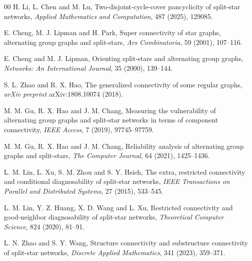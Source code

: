 \documentclass[12pt,a4paper]{amsart}
\theoremstyle{definition}
\begin{document}
%	
%	
%	
	\newpage
	\begin{thebibliography}{00}
		 H. Li, L. Chen and M. Lu, Two-disjoint-cycle-cover pancyclicity of split-star networks,
		\textit{Applied Mathematics and Computation}, 487 (2025), 129085.

         E. Cheng, M. J. Lipman and H. Park, Super connectivity of star graphs, alternating group graphs and split-stars,
        \textit{Ars Combinatoria}, 59 (2001), 107--116.

         E. Cheng and M. J. Lipman, Orienting split-stars and alternating group graphs,
        \textit{Networks: An International Journal}, 35 (2000), 139--144.


         S. L. Zhao and R. X. Hao, The generalized connectivity of some regular graphs,
        \textit{arXiv preprint} arXiv:1808.10074 (2018).

         M. M. Gu, R. X. Hao and J. M. Chang, Measuring the vulnerability of alternating group graphs and split-star networks in terms of component connectivity,
        \textit{IEEE Access}, 7 (2019), 97745--97759.

         M. M. Gu, R. X. Hao and J. M. Chang, Reliability analysis of alternating group graphs and split-stars,
        \textit{The Computer Journal}, 64 (2021), 1425--1436.

         L. M. Lin, L. Xu, S. M. Zhou and S. Y. Hsieh, The extra, restricted connectivity and conditional diagnosability of split-star networks,
        \textit{IEEE Transactions on Parallel and Distributed Systems}, 27 (2015), 533--545.

         L. M. Lin, Y. Z. Huang, X. D. Wang and L. Xu, Restricted connectivity and good-neighbor diagnosability of split-star networks,
        \textit{Theoretical Computer Science}, 824 (2020), 81--91.

         L. N. Zhao and S. Y. Wang, Structure connectivity and substructure connectivity of split-star networks,
        \textit{Discrete Applied Mathematics}, 341 (2023), 359--371.


\end{thebibliography}
\end{document}
